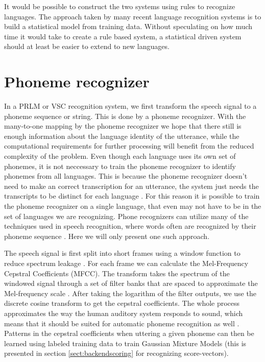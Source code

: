 It would be possible to construct the two systems using rules to recognize languages. The approach taken by many recent language recognition systems is to build a statistical model from training data. Without speculating on how much time it would take to create a rule based system, a statistical driven system should at least be easier to extend to new languages.


\section{Phoneme recognizer}
\label{sect:phnrec}

In a PRLM or VSC recognition system, we first transform the speech signal to a phoneme sequence or string. This is done by a phoneme recognizer. With the many-to-one mapping by the phoneme recognizer we hope that there still is enough information about the language identity of the utterance, while the computational requirements for further processing will benefit from the reduced complexity of the problem. Even though each language uses its own set of phonemes, it is not neccessary to train the phoneme recognizer to identify phonemes from all languages. This is because the phoneme recognizer doesn't need to make an correct transcription for an utterance, the system just needs the transcripts to be distinct for each language \cite[p. 818]{lidbok}. For this reason it is possible to train the phoneme recognizer on a single language, that even may not have to be in the set of languages we are recognizing. Phone recognizers can utilize many of the techniques used in speech recognition,  where words often are recognized by their phoneme sequence \cite[p. 414]{talegk}. Here we will only present one such approach.

The speech signal is first split into short frames using a window function to reduce spectrum leakage \cite[257]{talegk}. For each frame we can calculate the Mel-Frequency Cepstral Coefficients (MFCC). The transform takes the spectrum of the windowed signal through a set of filter banks that are spaced to approximate the Mel-frequency scale \cite[314]{talegk}. After taking the logarithm of the filter outputs, we use the discrete cosine transform to get the cepstral coefficients. The whole process approximates the way the human auditory system responds to sound, which means that it should be suited for automatic phoneme recognition as well \cite[314]{talegk}. Patterns in the cepstral coefficients when uttering a given phoneme can then be learned using labeled training data to train Gaussian Mixture Models (this is presented in section \ref{sect:backendscoring} for recognizing score-vectors).

